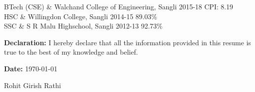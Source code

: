 \documentclass[a4paper,11pt]{article}
\begin{document}
\begin{center}
\begin{minipage}[t]{0.6\textwidth}
\begin{LARGE}
\begin{tabu}
			   		\normalsize BTech (CSE) & {\normalsize Walchand College of Engineering, Sangli} \linebreak \normalsize 2015-18 \hspace{1cm}\normalsize CPI: 8.19\medskip\\
			   		\hline
			   		\normalsize HSC & \normalsize Willingdon College, Sangli \linebreak \normalsize 2014-15 \hspace{1cm}\normalsize 89.03\%\medskip\\
					\hline
				    \normalsize SSC & \normalsize S R Malu Highschool, Sangli \linebreak\normalsize 2012-13 \hspace{1cm}\normalsize 92.73\%\medskip\\
				\end{tabu}
			\end{LARGE}
		\end{minipage}%
		\linebreak\linebreak\linebreak
		\medskip
		\raggedright
		\textbf{Declaration:} I hereby declare that all the information provided in this resume is true to the best of my knowledge and belief.\linebreak\linebreak
		\begin{minipage}[t]{0.5\textwidth}
			\raggedright
			\textbf{Date:} \today
		\end{minipage}%
		\begin{minipage}[t]{0.5\textwidth}
			\raggedleft
			Rohit Girish Rathi
		\end{minipage}%
	\end{center}
\end{document}
